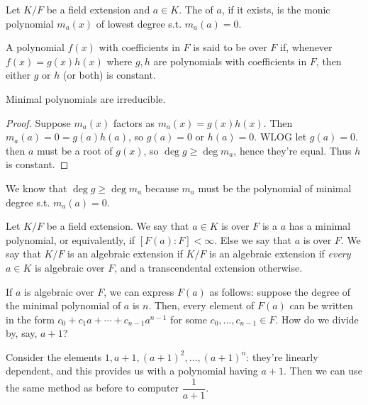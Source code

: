 \documentclass{scrartcl}
\begin{document}
\begin{definition}
    Let $K/F$ be a field extension and $a \in K$. The  of $a$, if it exists, is the monic polynomial $m_a(x)$ of lowest degree s.t. $m_a(a) = 0$.
\end{definition}

\begin{definition}
    A polynomial $f(x)$ with coefficients in $F$ is said to be  over $F$ if, whenever $f(x) = g(x)h(x)$ where $g,h$ are polynomials with coefficients in $F$, then either $g$ or $h$ (or both) is constant.
\end{definition}

\begin{proposition}
    Minimal polynomials are irreducible.
\end{proposition}

\begin{proof}
    Suppose $m_a(x)$ factors as $m_a(x)=g(x)h(x)$. Then $m_a(a) = 0 = g(a)h(a)$, so $g(a) = 0$ or $h(a) = 0$. WLOG let $g(a) = 0$. then $a$ must be a root of $g(x)$, so $\deg g \ge \deg m_a$, hence they're equal. Thus $h$ is constant.
\end{proof}

\begin{note}
    We know that $\deg g \ge \deg m_a$ because $m_a$ must be the polynomial of minimal degree s.t. $m_a(a) = 0$.
\end{note}

\begin{definition}
    Let $K/F$ be a field extension. We say that $a \in K$ is  over $F$ is a $a$ has a minimal polynomial, or equivalently, if $[F(a) : F] < \infty$. Else we say that $a$ is  over $F$. We say that $K/F$ is an algebraic extension if $K/F$ is an algebraic extension if \textit{every} $a \in K$ is algebraic over $F$, and a transcendental extension otherwise.
\end{definition}

If $a$ is algebraic over $F$, we can express $F(a)$ as follows: suppose the degree of the minimal polynomial of $a$ is $n$. Then, every element of $F(a)$ can be written in the form $c_0 + c_1a + \cdots + c_{n-1}a^{n-1}$ for some $c_0, \dotsc, c_{n-1} \in F$. How do we divide by, say, $a+1$?

Consider the elements $1, a+1, (a+1)^2,\dotsc, (a+1)^n$: they're linearly dependent, and this provides us with a polynomial having $a+1$. Then we can use the same method as before to computer $\dfrac{1}{a+1}$.
\end{document}
